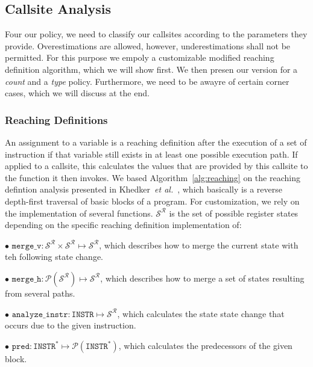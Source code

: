 \subsection{Callsite Analysis}
\label{section:callsiteanalysis}
Four our policy, we need to classify our callsites according to the parameters they provide. Overestimations are allowed, however, underestimations shall not be permitted. For this purpose we empoly a customizable modified reaching definition algorithm, which we will show first. We then presen our version for a \emph{count} and a \emph{type} policy. Furthermore, we need to be awayre of certain corner cases, which we will discuss at the end.

\subsubsection{Reaching Definitions}
\label{subsection:reachindefinitionstheory}
An assignment to a variable is a reaching definition after the execution of a set of instruction if that variable still exists in at least one possible execution path. 
If applied to a callsite, this calculates the values that are provided by this callsite to the function it then invokes. 
We based Algorithm~\ref{alg:reaching} on the reaching defintion analysis presented in Khedker~\textit{et al.}~\cite{khedker2009data}, 
which basically is a reverse depth-first traversal of basic blocks of a program. For customization, we rely on 
the implementation of several functions. $\mathcal{S}^\mathcal{R}$ is the set of possible register states depending on the specific reaching definition implementation of:

$\bullet$ $\texttt{merge\_v} : \mathcal{S}^\mathcal{R} \times \mathcal{S}^\mathcal{R} \mapsto \mathcal{S}^\mathcal{R}$, which describes how to merge the current state with teh following state change.

$\bullet$ $\texttt{merge\_h} : \mathcal{P}(\mathcal{S}^\mathcal{R}) \mapsto \mathcal{S}^\mathcal{R}$, which describes how to merge a set of states resulting from several paths.

$\bullet$ $\texttt{analyze\_instr} : \texttt{INSTR} \mapsto \mathcal{S}^\mathcal{R}$, which calculates the state state change that occurs due to the given instruction.

$\bullet$ $\texttt{pred} : \texttt{INSTR}^* \mapsto \mathcal{P}(\texttt{INSTR}^*)$, which calculates the predecessors of the given block.


